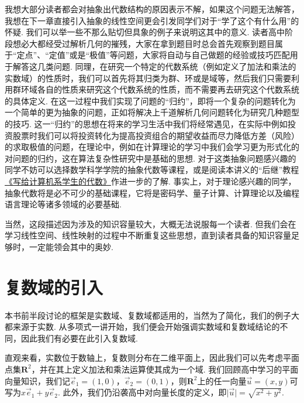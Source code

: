 我想大部分读者都会对抽象出代数结构的原因表示不解，如果这个问题无法解答，我想在下一章直接引入抽象的线性空间更会引发同学们对于``学了这个有什么用''的怀疑. 我们可以举一些不那么贴切但具象的例子来说明这其中的意义. 读者高中阶段想必大都经受过解析几何的摧残，大家在拿到题目时总会首先观察到题目属于``定点''、``定值''或是``极值''等问题，大家将自动与自己做题的经验或技巧匹配用于解答这几类问题. 同理，在研究一个特定的代数系统（例如定义了加法和乘法的实数域）的性质时，我们可以首先将其归类为群、环或是域等，然后我们只需要利用群环域各自的性质来研究这个代数系统的性质，而不需要再去研究这个代数系统的具体定义. 在这一过程中我们实现了问题的``归约''，即将一个复杂的问题转化为一个简单的更为抽象的问题，正如将解决上千道解析几何问题转化为研究几种题型的技巧. 这一``归约''的思想在将来的学习生活中我们将经常遇见，在实际中例如投资股票时我们可以将投资转化为提高投资组合的期望收益而尽力降低方差（风险）的求取极值的问题，在理论中，例如在计算理论的学习中我们会学习更为形式化的对问题的归约，这在算法复杂性研究中是基础的思想. 对于这类抽象问题感兴趣的同学不妨可以选择数学科学学院的抽象代数等课程，或是阅读本讲义的``后继''教程\href{https://frightenedfoxcn.github.io/notes/series/alg-for-cs/}{《写给计算机系学生的代数》}作进一步的了解. 事实上，对于理论感兴趣的同学，抽象代数将是必不可少的基础课程，它将是密码学、量子计算、计算理论以及编程语言理论等诸多领域的必要基础.

当然，这段描述因为涉及的知识容量较大，大概无法说服每一个读者. 但我们会在学习线性空间、线性映射的过程中不断重复这些思想，直到读者具备的知识容量足够时，一定能领会其中的奥妙.

\section{复数域的引入}

本书前半段讨论的框架是实数域、复数域都适用的，当然为了简化，我们的例子大都来源于实数. 从多项式一讲开始，我们便会开始强调实数域和复数域结论的不同，因此我们有必要在此引入复数域.

直观来看，实数位于数轴上，复数则分布在二维平面上，因此我们可以先考虑平面点集$\mathbf{R}^2$，并在其上定义加法和乘法运算使其成为一个域. 我们回顾高中学习的平面向量知识，我们记$\vec{e}_1=(1,0)$，$\vec{e}_2=(0,1)$，则$\mathbf{R}^2$上的任一向量$\vec{u}=(x,y)$可写为$x\vec{e}_1+y\vec{e}_2$. 此外，我们仍沿袭高中对向量长度的定义，即$\lvert\vec{u}\rvert=\sqrt{x^2+y^2}$.

